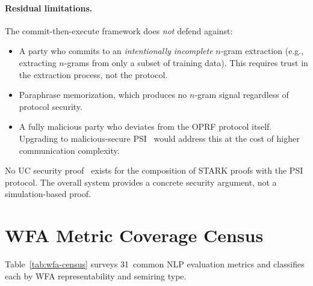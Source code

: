 \documentclass[11pt]{article}
\begin{document}
\paragraph{Residual limitations.}
The commit-then-execute framework does \emph{not} defend against:
\begin{itemize}[nosep]
\item A party who commits to an \emph{intentionally incomplete}
  $n$-gram extraction (e.g., extracting $n$-grams from only a subset
  of training data).  This requires trust in the extraction process,
  not the protocol.
\item Paraphrase memorization, which produces no $n$-gram signal
  regardless of protocol security.
\item A fully malicious party who deviates from the OPRF protocol
  itself.  Upgrading to malicious-secure PSI~\cite{freedman2004psi}
  would address this at the cost of higher communication complexity.
\end{itemize}

No UC security proof~\cite{canetti2001uc} exists for the composition
of STARK proofs with the PSI protocol.  The overall system provides
a concrete security argument, not a simulation-based proof.


\section{WFA Metric Coverage Census}\label{app:wfa-census}

Table~\ref{tab:wfa-census} surveys 31~common NLP evaluation metrics
and classifies each by WFA representability and semiring type.
\end{document}
